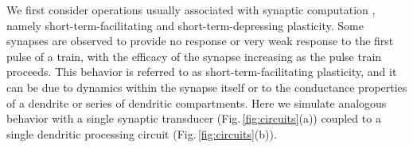 \documentclass[twocolumn]{article}
\begin{document}
We first consider operations usually associated with synaptic computation \cite{abre2004}, namely short-term-facilitating and short-term-depressing plasticity. Some synapses are observed to provide no response or very weak response to the first pulse of a train, with the efficacy of the synapse increasing as the pulse train proceeds. This behavior is referred to as short-term-facilitating plasticity, and it can be due to dynamics within the synapse itself or to the conductance properties of a dendrite or series of dendritic compartments. Here we simulate analogous behavior with a single synaptic transducer (Fig.\,\ref{fig:circuits}(a)) coupled to a single dendritic processing circuit (Fig.\,\ref{fig:circuits}(b)). 

\begin{figure}[tb] 
\end{figure}
\end{document}
